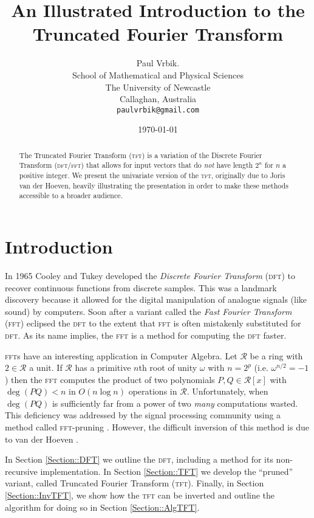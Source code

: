 \documentclass[12pt]{article}
\title{An Illustrated Introduction to the Truncated Fourier Transform}
\author{Paul Vrbik. \\
School of Mathematical and Physical Sciences \\
The University of Newcastle\\
Callaghan, Australia\\
\tt{paulvrbik@gmail.com}}
\date{\today}
\theoremstyle{definition}
\newcommand{\0}{\mathbf{0}}
\theoremstyle{theorem}
\theoremstyle{definition}
\newcommand{\RR}{\mathcal{R}}
\newcommand{\w}{\omega}
\begin{document}
\maketitle


\begin{abstract}
The Truncated Fourier Transform (\textsc{tft}) is a variation of the Discrete Fourier Transform (\textsc{dft}/\textsc{fft}) that allows for input vectors that do \emph{not} have length $2^n$ for $n$ a positive integer. We present the univariate version of the \textsc{tft}, originally due to Joris van der Hoeven, heavily illustrating the presentation in order to make these methods accessible to a broader audience.
\end{abstract}



\section{Introduction}


In 1965 Cooley and Tukey developed the \emph{Discrete Fourier Transform} (\textsc{dft}) to recover continuous functions from discrete samples. This was a landmark discovery because it allowed for the digital manipulation of analogue signals (like sound) by computers. Soon after a variant called the \emph{Fast Fourier Transform} (\textsc{fft}) eclipsed the \textsc{dft} to the extent that \textsc{fft} is often mistakenly substituted for \textsc{dft}. As its name implies, the \textsc{fft} is a method for computing the \textsc{dft} faster.






\textsc{fft}s have an interesting application in Computer Algebra. Let $\RR$ be a ring with $2 \in \RR$ a unit. If $\RR$ has a primitive $n$th root of unity $\w$ with $n=2^p$ (i.e. $\w^{n/2}=-1$) then the \textsc{fft} computes the product of two polynomials $P,Q \in \RR[x]$ with $\deg(PQ)<n$ in $O(n\log n)$ operations in $\RR$. Unfortunately, when $\deg(PQ)$ is sufficiently far from a power of two \emph{many} computations wasted. This deficiency was addressed by the signal processing community using a method called \textsc{fft}-pruning \cite{SigProcessing}. However, the difficult inversion of this method is due to van der Hoeven \cite{TFT2}\cite{TFT1}.\smallskip

In Section \ref{Section::DFT} we outline the \textsc{dft}, including a method for its non-recursive implementation. In Section \ref{Section::TFT} we develop the ``pruned'' variant, called Truncated Fourier Transform (\textsc{tft}). Finally, in Section \ref{Section::InvTFT}, we show how the \textsc{tft} can be inverted and outline the algorithm for doing so in Section \ref{Section::AlgTFT}.
\end{document}
